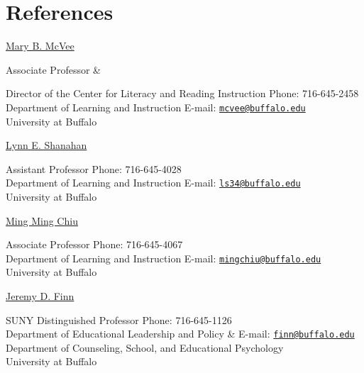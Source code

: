 \section{References}
\href{http://gse.buffalo.edu/about/directory/faculty/2039}{Mary B. McVee}
\begin{innerlist}
\item[] Associate Professor \&
\item[] Director of the Center for Literacy and Reading Instruction \hfill {Phone: 716-645-2458}\\
Department of Learning and Instruction \hfill{E-mail: \href{mailto:mcvee@buffalo.edu}{\nolinkurl{mcvee@buffalo.edu}}}\\
University at Buffalo
\end{innerlist}

\href{http://gse.buffalo.edu/about/directory/faculty/2110}{Lynn E. Shanahan}
\begin{innerlist}
\item[] Assistant Professor \hfill {Phone: 716-645-4028}\\
Department of Learning and Instruction \hfill{E-mail: \href{mailto:ls34@buffalo.edu}{\nolinkurl{ls34@buffalo.edu}}}\\
University at Buffalo
\end{innerlist}

\href{http://gse.buffalo.edu/about/directory/faculty/2135}{Ming Ming Chiu}
\begin{innerlist}
\item[] Associate Professor \hfill {Phone: 716-645-4067}\\
Department of Learning and Instruction \hfill{E-mail: \href{mailto:mingchiu@buffalo.edu}{\nolinkurl{mingchiu@buffalo.edu}}}\\
University at Buffalo
\end{innerlist}

\href{http://gse.buffalo.edu/about/directory/faculty/finn}{Jeremy D. Finn}
\begin{innerlist}
\item[] SUNY Distinguished Professor \hfill {Phone: 716-645-1126}\\
Department of Educational Leadership and Policy \&  \hfill{E-mail: \href{mailto:finn@buffalo.edu}{\nolinkurl{finn@buffalo.edu}}}\\
Department of Counseling, School, and Educational Psychology\\
University at Buffalo
\end{innerlist}
\halfblankline


\halfblankline




